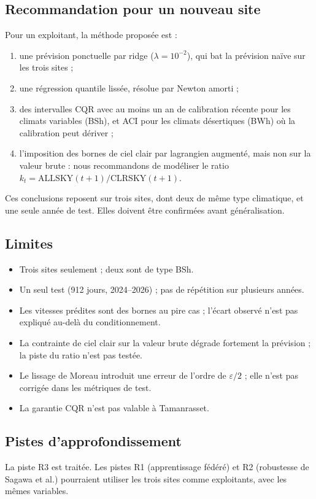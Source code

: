 \documentclass[11pt,a4paper]{article}
\theoremstyle{remark}
\theoremstyle{definition}
\begin{document}
\subsection{Recommandation pour un nouveau site}
Pour un exploitant, la méthode proposée est :
\begin{enumerate}[itemsep=2pt]
\item une prévision ponctuelle par ridge ($\lambda = 10^{-2}$), qui bat la prévision naïve sur les trois sites ;
\item une régression quantile lissée, résolue par Newton amorti ;
\item des intervalles CQR avec au moins un an de calibration récente pour les climats variables (BSh), et ACI pour les climats désertiques (BWh) où la calibration peut dériver ;
\item l'imposition des bornes de ciel clair par lagrangien augmenté, mais non sur la valeur brute : nous recommandons de modéliser le ratio $k_t = \mathrm{ALLSKY}(t+1)/\mathrm{CLRSKY}(t+1)$.
\end{enumerate}
Ces conclusions reposent sur trois sites, dont deux de même type climatique, et une seule année de test. Elles doivent être confirmées avant généralisation.

\subsection{Limites}
\begin{itemize}[itemsep=2pt]
\item Trois sites seulement ; deux sont de type BSh.
\item Un seul test (912 jours, 2024--2026) ; pas de répétition sur plusieurs années.
\item Les vitesses prédites sont des bornes au pire cas ; l'écart observé n'est pas expliqué au-delà du conditionnement.
\item La contrainte de ciel clair sur la valeur brute dégrade fortement la prévision ; la piste du ratio n'est pas testée.
\item Le lissage de Moreau introduit une erreur de l'ordre de $\varepsilon/2$ ; elle n'est pas corrigée dans les métriques de test.
\item La garantie CQR n'est pas valable à Tamanrasset.
\end{itemize}

\subsection{Pistes d'approfondissement}
La piste R3 est traitée. Les pistes R1 (apprentissage fédéré) et R2 (robustesse de Sagawa et al.) pourraient utiliser les trois sites comme exploitants, avec les mêmes variables.
\end{document}
